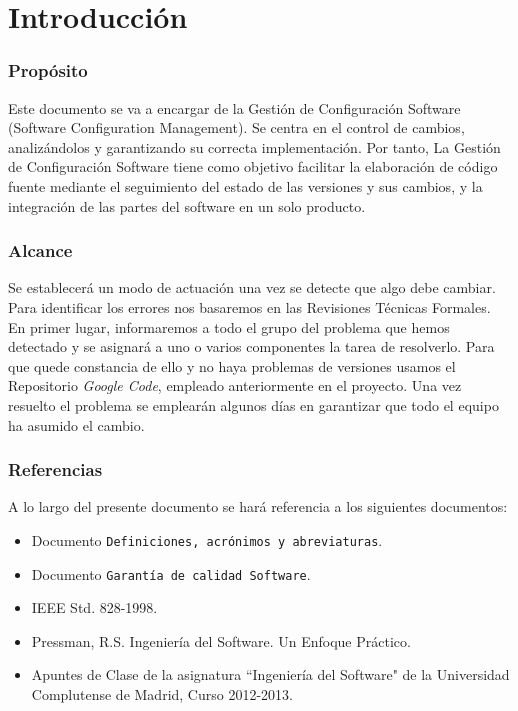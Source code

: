 \documentclass[spanish,a4paper,11pt, twoside]{report}	%
\begin{document}
\newpage
\mbox{}
\thispagestyle{empty}						%
\newpage


\tableofcontents 							%

\newpage
\mbox{}
\thispagestyle{empty}						%
\newpage


\part{Introducción}
	\section{Propósito}Este documento se va a encargar de la Gestión de Configuración Software (Software Configuration Management). Se centra en el control de cambios, analizándolos y garantizando su correcta implementación. Por tanto, La Gestión de Configuración Software tiene como objetivo facilitar la elaboración de código fuente mediante el seguimiento del estado de las versiones y sus cambios, y la integración de las partes del software en un solo producto.
	\section{Alcance}Se establecerá un modo de actuación una vez se detecte que algo debe cambiar. Para identificar los errores nos basaremos en las Revisiones Técnicas Formales. En primer lugar, informaremos a todo el grupo del problema que hemos detectado y se asignará a uno o varios componentes la tarea de resolverlo. Para que quede constancia de ello y no haya problemas de versiones usamos el Repositorio \textit{Google Code}, empleado anteriormente en el proyecto. Una vez resuelto el problema se emplearán algunos días en garantizar que todo el equipo  ha asumido el cambio.
	\section{Referencias} A lo largo del presente documento se hará referencia a los siguientes documentos:
	\begin{itemize}
		\item Documento \texttt{Definiciones, acrónimos y abreviaturas}.
		\item Documento \texttt{Garantía de calidad Software}.
		\item IEEE Std. 828-1998.
		\item Pressman, R.S. Ingeniería del Software. Un Enfoque Práctico.
		\item Apuntes de Clase de la asignatura “Ingeniería del Software" de la Universidad Complutense de Madrid, Curso 2012-2013.

	\end{itemize}
\end{document}
